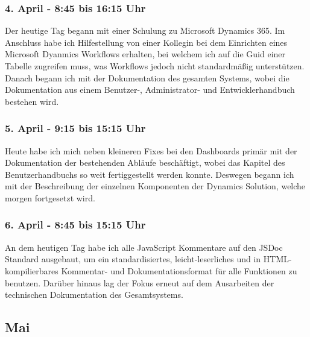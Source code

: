 \subsubsection*{4. April - 8:45 bis 16:15 Uhr}
Der heutige Tag begann mit einer Schulung zu Microsoft Dynamics 365. Im Anschluss habe ich Hilfestellung von einer Kollegin bei dem Einrichten eines Microsoft Dyanmics Workflows erhalten, bei welchem ich auf die Guid einer Tabelle zugreifen muss, was Workflows jedoch nicht standardmäßig unterstützen. Danach begann ich mit der Dokumentation des gesamten Systems, wobei die Dokumentation aus einem Benutzer-, Administrator- und Entwicklerhandbuch bestehen wird.

\subsubsection*{5. April - 9:15 bis 15:15 Uhr}
Heute habe ich mich neben kleineren Fixes bei den Dashboards primär mit der Dokumentation der bestehenden Abläufe beschäftigt, wobei das Kapitel des Benutzerhandbuchs so weit fertiggestellt werden konnte. Deswegen begann ich mit der Beschreibung der einzelnen Komponenten der Dynamics Solution, welche morgen fortgesetzt wird.

\subsubsection*{6. April - 8:45 bis 15:15 Uhr}
An dem heutigen Tag habe ich alle JavaScript Kommentare auf den JSDoc Standard ausgebaut, um ein standardisiertes, leicht-leserliches und in HTML-kompilierbares Kommentar- und Dokumentationsformat für alle Funktionen zu benutzen. Darüber hinaus lag der Fokus erneut auf dem Ausarbeiten der technischen Dokumentation des Gesamtsystems.

\subsection{Mai}
